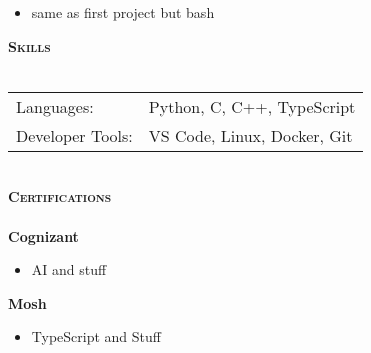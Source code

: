 \documentclass[a4paper]{article}
\newcommand{\lineunder} {
    \vspace*{-8pt} \\
    \hspace*{-18pt} \hrulefill \\
}
\newcommand{\header} [1] {
    {\hspace*{-18pt}\vspace*{6pt} \textsc{#1}}
    \vspace*{-6pt} \lineunder
}
\begin{document}
\begin{itemize} \itemsep 0pt 
 \item{same as first project but bash} 
 \end{itemize} 
\header{\textbf{Skills}} 
\begin{tabular}{l l} 
Languages: & Python, C, C++, TypeScript \\ 
Developer Tools: & VS Code, Linux, Docker, Git \\ 
\end{tabular} \\ 
\header{\textbf{Certifications}} 
\textbf{Cognizant} 
\begin{itemize} \itemsep 0pt 
 \item{AI and stuff} 
 \end{itemize} 
\textbf{Mosh} 
\begin{itemize} \itemsep 0pt 
 \item{TypeScript and Stuff} 
 \end{itemize} 
\end{document}
